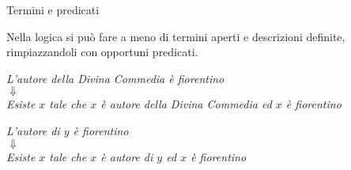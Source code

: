\documentclass[10pt,dvipsnames]{beamer}
\begin{document}
\begin{frame}{Termini e predicati}

Nella logica si può fare a meno di termini aperti e descrizioni definite, rimpiazzandoli con opportuni predicati.

\begin{example}
    \itshape\centering
    \alert<2->{L'autore della Divina Commedia} è fiorentino\\
    $\Downarrow$\\
    Esiste $x$ tale che \alert<2->{$x$ è autore della Divina Commedia} ed $x$ è fiorentino
\end{example}

\begin{example}
    \itshape\centering
    \alert<3->{L'autore di $y$} è fiorentino\\
    $\Downarrow$\\
    Esiste $x$ tale che \alert<3->{$x$ è autore di $y$} ed $x$ è fiorentino
\end{example}

\end{frame}

\fi
\end{document}

